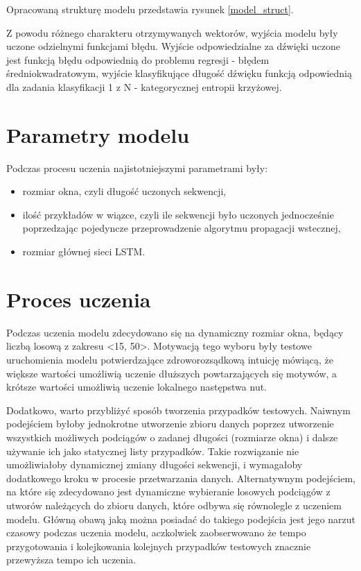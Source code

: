 {{        Opracowaną strukturę modelu przedstawia rysunek \ref{model_struct}.
        
        

        Z powodu różnego charakteru otrzymywanych wektorów, wyjścia modelu były uczone odzielnymi funkcjami błędu. 
        Wyjście odpowiedzialne za dźwięki uczone jest funkcją błędu odpowiednią do problemu 
        regresji - błędem średniokwadratowym, wyjście klasyfikujące długość dźwięku funkcją odpowiednią
        dla zadania klasyfikacji  1\,\,z\,\,N - kategorycznej entropii krzyżowej.
    }

    \newpage

    \section{Parametry modelu}
    {
        Podczas procesu uczenia najistotniejszymi parametrami były:
        \begin{itemize}
            \setlength\itemsep{-0.5em}
            \item rozmiar okna, czyli długość uczonych sekwencji,
            \item ilość przykładów w wiązce, czyli ile sekwencji było uczonych jednocześnie
            poprzedzając pojedyncze przeprowadzenie algorytmu propagacji wstecznej,
            \item rozmiar głównej sieci LSTM.
        \end{itemize}
    }

    \section{Proces uczenia}
    {
        Podczas uczenia modelu zdecydowano się na dynamiczny rozmiar okna,
        będący liczbą losową z zakresu <15, 50>. Motywacją tego wyboru były testowe 
        uruchomienia modelu potwierdzające zdroworozsądkową intuicję mówiącą, że większe wartości
        umożliwią uczenie dłuższych powtarzających się motywów, a krótsze wartości umożliwią uczenie lokalnego następstwa nut.

        Dodatkowo, warto przybliżyć sposób tworzenia przypadków testowych. Naiwnym podejściem byłoby
        jednokrotne utworzenie zbioru danych poprzez utworzenie wszystkich możliwych podciągów o zadanej
        długości (rozmiarze okna) i dalsze używanie ich jako statycznej listy przypadków. 
        Takie rozwiązanie nie umożliwiałoby dynamicznej zmiany długości sekwencji, i wymagałoby dodatkowego 
        kroku w procesie przetwarzania danych. Alternatywnym podejściem, na które się zdecydowano jest dynamiczne
        wybieranie losowych podciągów z utworów należących do zbioru danych, które odbywa się równolegle z uczeniem modelu. 
        Główną obawą jaką można posiadać do takiego podejścia jest jego narzut czasowy podczas uczenia modelu, 
        aczkolwiek zaobserwowano że tempo przygotowania i kolejkowania kolejnych przypadków testowych znacznie przewyższa tempo ich uczenia.

}}
